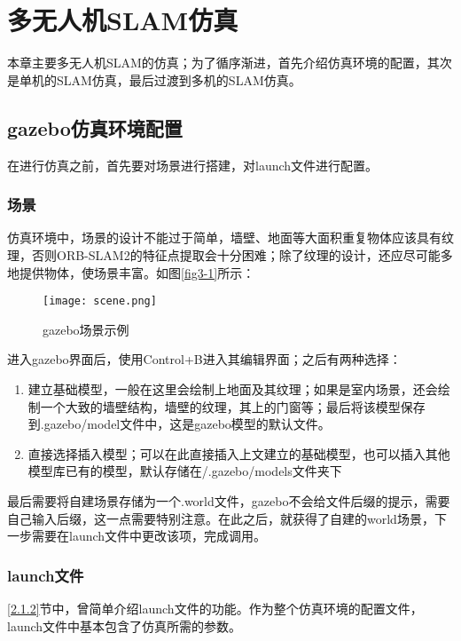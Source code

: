 \chapter{多无人机SLAM仿真} \label{Simulation}

本章主要多无人机SLAM的仿真；为了循序渐进，首先介绍仿真环境的配置，其次是单机的SLAM仿真，最后过渡到多机的SLAM仿真。


\section{gazebo仿真环境配置}

在进行仿真之前，首先要对场景进行搭建，对launch文件进行配置。

\subsection{场景} \label{4.1.1}

仿真环境中，场景的设计不能过于简单，墙壁、地面等大面积重复物体应该具有纹理，否则ORB-SLAM2的特征点提取会十分困难；除了纹理的设计，还应尽可能多地提供物体，使场景丰富。如图\ref{fig3-1}所示：

\begin{figure}[!ht]
	\centering
	\texttt{[image: scene.png]}
	\caption{gazebo场景示例}
	\label{fig4-1}
\end{figure}

进入gazebo界面后，使用Control+B进入其编辑界面；之后有两种选择：

\begin{enumerate}
	\item 建立基础模型，一般在这里会绘制上地面及其纹理；如果是室内场景，还会绘制一个大致的墙壁结构，墙壁的纹理，其上的门窗等；最后将该模型保存到.gazebo/model文件中，这是gazebo模型的默认文件。
	\item 直接选择插入模型；可以在此直接插入上文建立的基础模型，也可以插入其他模型库已有的模型，默认存储在/.gazebo/models文件夹下
\end{enumerate}

最后需要将自建场景存储为一个.world文件，gazebo不会给文件后缀的提示，需要自己输入后缀，这一点需要特别注意。在此之后，就获得了自建的world场景，下一步需要在launch文件中更改该项，完成调用。


\subsection{launch文件} \label{4.1.2}

\ref{2.1.2}节中，曾简单介绍launch文件的功能。作为整个仿真环境的配置文件，launch文件中基本包含了仿真所需的参数。

